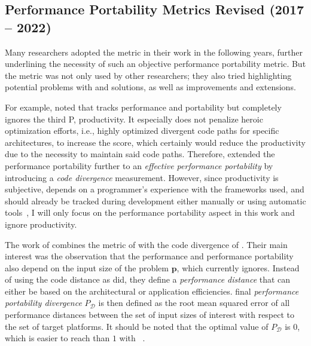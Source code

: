 \subsection{Performance Portability Metrics Revised (2017 -- 2022)}
\label{sec:pp_revised}

Many researchers adopted the \pp metric in their work in the following years, further underlining the necessity of such an objective performance portability metric. 
But the \pp metric was not only used by other researchers; they also tried highlighting potential problems with \pp and solutions, as well as improvements and extensions. 

For example, \citet{harrell_effective_2018} noted that \pp tracks performance and portability but completely ignores the third P, productivity. 
It especially does not penalize heroic optimization efforts, i.e., highly optimized divergent code paths for specific architectures, to increase the \pp score, which certainly would reduce the productivity due to the necessity to maintain said code paths. 
Therefore, \citeauthor{harrell_effective_2018} extended the performance portability further to an \textit{effective performance portability} by introducing a \textit{code divergence} measurement. 
However, since productivity is subjective, depends on a programmer's experience with the frameworks used, and should already be tracked during development either manually or using automatic tools~\cite{harrell_effective_2018}, I will only focus on the performance portability aspect in this work and ignore productivity. 

The work of \citet{daniel_applying_2019} combines the \pp metric of \citet{pennycook_evaluating_2018} with the code divergence of \citet{harrell_effective_2018}. 
Their main interest was the observation that the performance and performance portability also depend on the input size of the problem $\mathbf{p}$, which \pp currently ignores. 
Instead of using the code distance as \citeauthor{harrell_effective_2018} did, they define a \textit{performance distance} that can either be based on the architectural or application efficiencies. 
\citeauthor{daniel_applying_2019} final \textit{performance portability divergence} $P_\mathcal{D}$ is then defined as the root mean squared error of all performance distances between the set of input sizes of interest with respect to the set of target platforms. 
It should be noted that the optimal value of $P_\mathcal{D}$ is $0$, which is easier to reach than $1$ with \pp~\cite{daniel_applying_2019}. 


